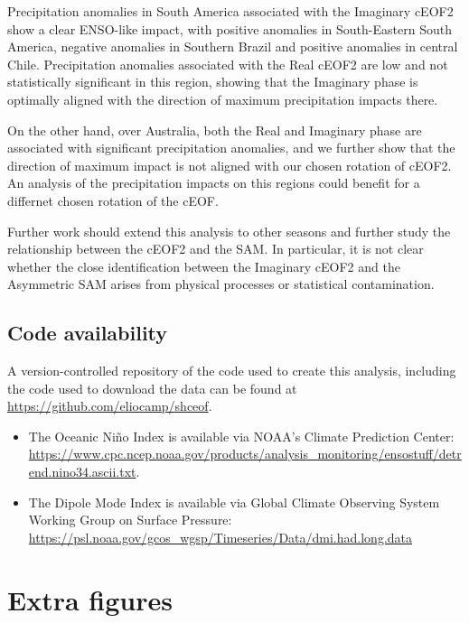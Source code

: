 \documentclass[smallextended]{svjour3}       %
\begin{document}
Precipitation anomalies in South America associated with the Imaginary cEOF2 show a clear ENSO-like impact, with positive anomalies in South-Eastern South America, negative anomalies in Southern Brazil and positive anomalies in central Chile.
Precipitation anomalies associated with the Real cEOF2 are low and not statistically significant in this region, showing that the Imaginary phase is optimally aligned with the direction of maximum precipitation impacts there.

On the other hand, over Australia, both the Real and Imaginary phase are associated with significant precipitation anomalies, and we further show that the direction of maximum impact is not aligned with our chosen rotation of cEOF2.
An analysis of the precipitation impacts on this regions could benefit for a differnet chosen rotation of the cEOF.

Further work should extend this analysis to other seasons and further study the relationship between the cEOF2 and the SAM.
In particular, it is not clear whether the close identification between the Imaginary cEOF2 and the Asymmetric SAM arises from physical processes or statistical contamination.

\hypertarget{code-availability}{%
\subsection*{Code availability}\label{code-availability}}

A version-controlled repository of the code used to create this analysis, including the code used to download the data can be found at \url{https://github.com/eliocamp/shceof}.

\begin{itemize}
\item
  The Oceanic Niño Index is available via NOAA's Climate Prediction Center: \url{https://www.cpc.ncep.noaa.gov/products/analysis_monitoring/ensostuff/detrend.nino34.ascii.txt}.
\item
  The Dipole Mode Index is available via Global Climate Observing System Working Group on Surface Pressure: \url{https://psl.noaa.gov/gcos_wgsp/Timeseries/Data/dmi.had.long.data}
\end{itemize}

\appendix


\hypertarget{extra-figures}{%
\section{Extra figures}\label{extra-figures}}
\end{document}
